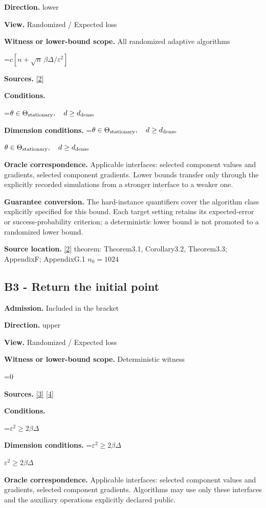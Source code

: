 \documentclass[10pt,a4paper]{article}
\newcommand{\AtlasMath}[1]{\par\begingroup\centering\setbox0=\hbox{$\displaystyle #1$}\ifdim\wd0>1.4\linewidth\typeout{ATLAS WIDE FORMULA: \the\wd0}\fi\ifdim\wd0>\linewidth\resizebox{\linewidth}{!}{\box0}\else\box0\fi\par\endgroup}
\newcommand{\AtlasInlineMath}[1]{\begingroup\setbox0=\hbox{$#1$}\ifdim\wd0>.4\linewidth\endgroup\AtlasMath{#1}\else\endgroup$#1$\fi}
\begin{document}
\textbf{Direction.} lower

\textbf{View.} Randomized / Expected loss

\textbf{Witness or lower-bound scope.} All randomized adaptive algorithms

\AtlasMath{c[n+\sqrt n\,\beta\Delta/\varepsilon^2]}
\textbf{Sources.} \href{https://arxiv.org/pdf/2609.00045v3}{[2]}

\textbf{Conditions.} 
\AtlasMath{\theta\in\Theta_{\rm stationary},\quad d\ge d_{\rm dense}}


\textbf{Dimension conditions.} \AtlasInlineMath{\theta\in\Theta_{\rm stationary},\quad d\ge d_{\rm dense}}

\textbf{Oracle correspondence.} Applicable interfaces: selected component values and gradients, selected component gradients. Lower bounds transfer only through the explicitly recorded simulations from a stronger interface to a weaker one.

\textbf{Guarantee conversion.} The hard-instance quantifiers cover the algorithm class explicitly specified for this bound. Each target setting retains its expected-error or success-probability criterion; a deterministic lower bound is not promoted to a randomized lower bound.

\textbf{Source location.} \href{https://arxiv.org/pdf/2609.00045v3}{[2]} theorem: Theorem3.1, Corollary3.2, Theorem3.3; AppendixF; AppendixG.1 $n_0=1024$

\subsection{B3 - Return the initial point}
\textbf{Admission.} Included in the bracket

\textbf{Direction.} upper

\textbf{View.} Randomized / Expected loss

\textbf{Witness or lower-bound scope.} Deterministic witness

\AtlasMath{0}
\textbf{Sources.} \href{https://proceedings.mlr.press/v97/zhou19b/zhou19b.pdf}{[3]} \href{https://arxiv.org/pdf/1405.4980}{[4]}

\textbf{Conditions.} 
\AtlasMath{\varepsilon^2\ge2\beta\Delta}


\textbf{Dimension conditions.} \AtlasInlineMath{\varepsilon^2\ge2\beta\Delta}

\textbf{Oracle correspondence.} Applicable interfaces: selected component values and gradients, selected component gradients. Algorithms may use only these interfaces and the auxiliary operations explicitly declared public.
\end{document}
